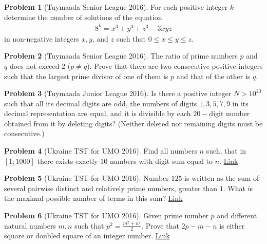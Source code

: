 \documentclass[]{article}
\theoremstyle{definition}
\newtheorem{problem}{Problem}
\begin{document}
\begin{problem}[Tuymaada Senior League 2016]
	For each positive integer $k$ determine the number of solutions of the equation
		\begin{align*}
			8^k = x^3 + y^3 + z^3 - 3xyz
		\end{align*}
	in non-negative integers $x,y$, and $z$ such that $0 \leq x \leq y \leq z$.
\end{problem}



\begin{problem}[Tuymaada Senior League 2016]
	The ratio of prime numbers $p$ and $q$ does not exceed $2$ ($p \neq q$). Prove
	that there are two consecutive positive integers such that the largest
	prime divisor of one of them is $p$ and that of the other is $q$.
\end{problem}


\begin{problem}[Tuymaada Junior League 2016]
	Is there a positive integer $N > 10^{20}$ such that all its decimal digits
	are odd, the numbers of digits $1, 3, 5, 7, 9$ in its decimal representation
	are equal, and it is divisible by each $20-$digit number obtained from it by
	deleting digits? (Neither deleted nor remaining digits must be consecutive.)
\end{problem}




\begin{problem}[Ukraine TST for UMO 2016]
	Find all numbers $n$ such, that in $[1;1000]$ there exists exactly $10$ numbers with digit sum equal to $n$. \hfill \href{http://artofproblemsolving.com/community/c6h1199874p5893842}{Link}
\end{problem}



\begin{problem}[Ukraine TST for UMO 2016]
	Number $125$ is written as the sum of several pairwise distinct and relatively prime numbers, greater than $1$. What is the maximal possible number of terms in this sum? \hfill \href{http://artofproblemsolving.com/community/c6h1200058p5895479}{Link}
\end{problem}



\begin{problem}[Ukraine TST for UMO 2016]
	Given prime number $p$ and different natural numbers $m, n$ such that $p^2=\frac{m^2+n^2}{2}$. Prove that $2p-m-n$ is either square or doubled square of an integer number. \hfill \href{http://artofproblemsolving.com/community/c6h1199895p5893899}{Link}
\end{problem}
\end{document}
